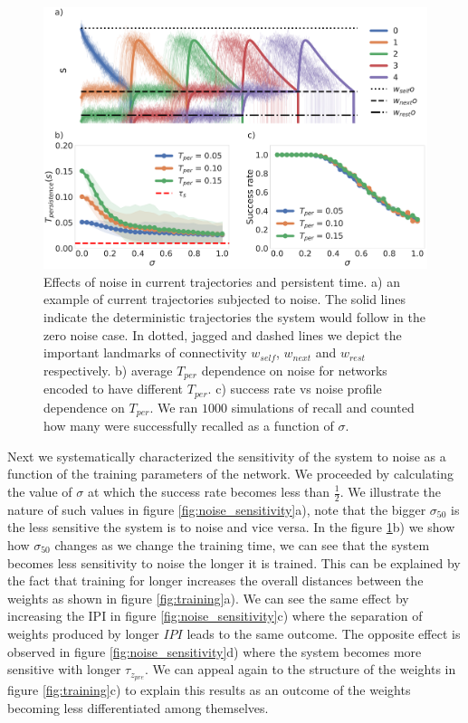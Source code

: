 \documentclass[10pt,a4paper]{article}
\begin{document}
\begin{figure}[H]
\centering
\includegraphics[scale=0.17]{noise_diagram.pdf}
\caption{Effects of noise in current trajectories and persistent time. a) an example of current trajectories subjected to noise. The solid lines indicate the deterministic trajectories the system would follow in the zero noise case. In dotted, jagged and dashed lines we depict the important landmarks of connectivity $w_{self}$, $w_{next}$ and $w_{rest}$ respectively. b)  average $T_{per}$ dependence on noise for networks encoded to have different $T_{per}$. c) success rate vs noise profile dependence on  $T_{per}$. We ran $1000$ simulations of recall and counted how many were successfully recalled as a function of $\sigma$. }
\label{fig:noise_scheme}
\end{figure}

Next we systematically characterized the sensitivity of the system to noise as a function of the training parameters of the network. We proceeded by calculating the value of $\sigma$ at which the success rate becomes less than $\frac{1}{2}$. We illustrate the nature of such values in figure \ref{fig:noise_sensitivity}a), note that the bigger $\sigma_{50}$ is the less sensitive the system is to noise and vice versa. In the figure \ref{fig:noise_scheme}b) we show how $\sigma_{50}$ changes as we change the training time, we can see that the system becomes less sensitivity to noise the longer it is trained. This can be explained by the fact that training for longer increases the overall distances between the weights as shown in figure \ref{fig:training}a). We can see the same effect by increasing the IPI in figure \ref{fig:noise_sensitivity}c) where the separation of weights produced by longer $IPI$ leads to the same outcome. The opposite effect is observed in figure \ref{fig:noise_sensitivity}d) where the system becomes more sensitive with longer $\tau_{z_{pre}}$. We can appeal again to the structure of the weights in figure \ref{fig:training}c) to explain this results as an outcome of the weights becoming less differentiated among themselves. 
\end{document}
